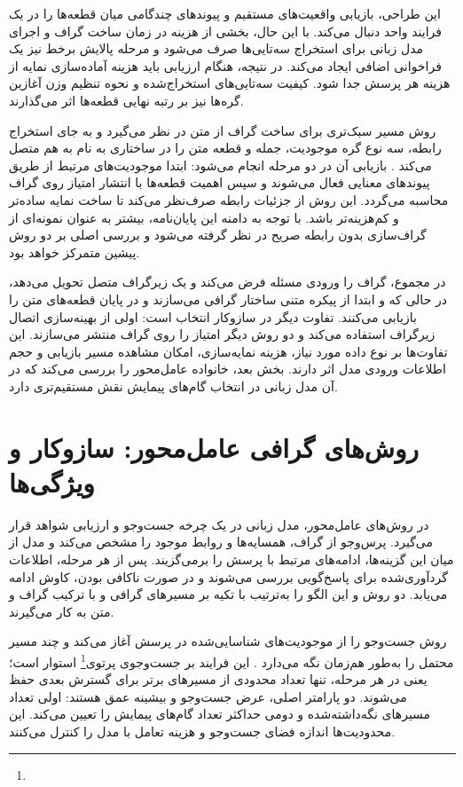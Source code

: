 این طراحی، بازیابی واقعیت‌های مستقیم و پیوندهای چندگامی میان قطعه‌ها را در یک فرایند واحد دنبال می‌کند. با این حال، بخشی از هزینه در زمان ساخت گراف و اجرای مدل زبانی برای استخراج سه‌تایی‌ها صرف می‌شود و مرحله پالایش برخط نیز یک فراخوانی اضافی ایجاد می‌کند. در نتیجه، هنگام ارزیابی  باید هزینه آماده‌سازی نمایه از هزینه هر پرسش جدا شود. کیفیت سه‌تایی‌های استخراج‌شده و نحوه تنظیم وزن آغازین گره‌ها نیز بر رتبه نهایی قطعه‌ها اثر می‌گذارند.

روش  مسیر سبک‌تری برای ساخت گراف از متن در نظر می‌گیرد و به جای استخراج رابطه، سه نوع گره موجودیت، جمله و قطعه متن را در ساختاری به نام  به هم متصل می‌کند \cite{zhuang2026linearrag}. بازیابی آن در دو مرحله انجام می‌شود: ابتدا موجودیت‌های مرتبط از طریق پیوندهای معنایی فعال می‌شوند و سپس اهمیت قطعه‌ها با انتشار امتیاز روی گراف محاسبه می‌گردد. این روش از جزئیات رابطه صرف‌نظر می‌کند تا ساخت نمایه ساده‌تر و کم‌هزینه‌تر باشد. با توجه به دامنه این پایان‌نامه،  بیشتر به عنوان نمونه‌ای از گراف‌سازی بدون رابطه صریح در نظر گرفته می‌شود و بررسی اصلی بر دو روش پیشین متمرکز خواهد بود.

در مجموع،  گراف را ورودی مسئله فرض می‌کند و یک زیرگراف متصل تحویل می‌دهد، در حالی که  و  ابتدا از پیکره متنی ساختار گرافی می‌سازند و در پایان قطعه‌های متن را بازیابی می‌کنند. تفاوت دیگر در سازوکار انتخاب است: اولی از بهینه‌سازی اتصال زیرگراف استفاده می‌کند و دو روش دیگر امتیاز را روی گراف منتشر می‌سازند. این تفاوت‌ها بر نوع داده مورد نیاز، هزینه نمایه‌سازی، امکان مشاهده مسیر بازیابی و حجم اطلاعات ورودی مدل اثر دارند. بخش بعد، خانواده عامل‌محور را بررسی می‌کند که در آن مدل زبانی در انتخاب گام‌های پیمایش نقش مستقیم‌تری دارد.

\section{روش‌های گرافی عامل‌محور: سازوکار و ویژگی‌ها}

در روش‌های عامل‌محور، مدل زبانی در یک چرخه جست‌وجو و ارزیابی شواهد قرار می‌گیرد. پرس‌وجو از گراف، همسایه‌ها و روابط موجود را مشخص می‌کند و مدل از میان این گزینه‌ها، ادامه‌های مرتبط با پرسش را برمی‌گزیند. پس از هر مرحله، اطلاعات گردآوری‌شده برای پاسخ‌گویی بررسی می‌شوند و در صورت ناکافی بودن، کاوش ادامه می‌یابد. دو روش  و  این الگو را به‌ترتیب با تکیه بر مسیرهای گرافی و با ترکیب گراف و متن به کار می‌گیرند.

روش  جست‌وجو را از موجودیت‌های شناسایی‌شده در پرسش آغاز می‌کند و چند مسیر محتمل را به‌طور هم‌زمان نگه می‌دارد \cite{sun2024think}. این فرایند بر جست‌وجوی پرتوی\footnote{} استوار است؛ یعنی در هر مرحله، تنها تعداد محدودی از مسیرهای برتر برای گسترش بعدی حفظ می‌شوند. دو پارامتر اصلی، عرض جست‌وجو و بیشینه عمق هستند: اولی تعداد مسیرهای نگه‌داشته‌شده و دومی حداکثر تعداد گام‌های پیمایش را تعیین می‌کند. این محدودیت‌ها اندازه فضای جست‌وجو و هزینه تعامل با مدل را کنترل می‌کنند.

